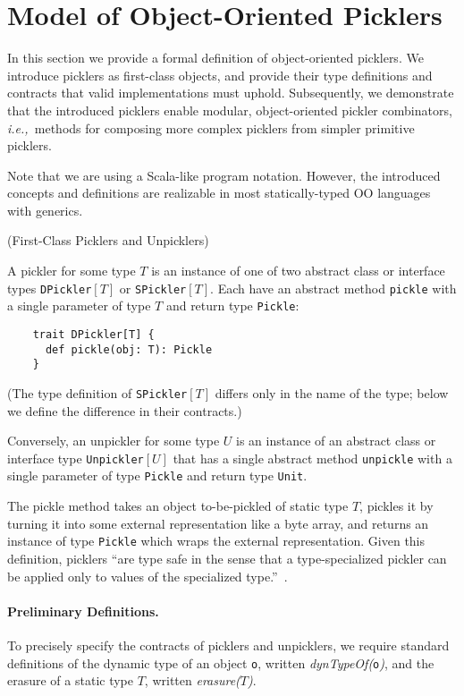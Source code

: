 \documentclass[preprint,10pt]{sigplanconf}
\theoremstyle{definition}
\newcommand{\ie}{{\em i.e.,~}}
\newcommand{\term}[1]{\mbox{\texttt{#1}}}
\newcommand{\itl}[1]{\mbox{\textit{#1}}}
\begin{document}
\section{Model of Object-Oriented Picklers}

In this section we provide a formal definition of object-oriented picklers. We
introduce picklers as first-class objects, and provide their type definitions
and contracts that valid implementations must uphold. Subsequently, we
demonstrate that the introduced picklers enable modular, object-oriented
pickler combinators, \ie methods for composing more complex picklers from
simpler primitive picklers.

Note that we are using a Scala-like program notation. However, the introduced
concepts and definitions are realizable in most statically-typed OO languages
with generics.

\begin{defn}(First-Class Picklers and Unpicklers)

A pickler for some type $T$ is an instance of one of two abstract class or
interface types \term{DPickler}$[T]$ or \term{SPickler}$[T]$. Each have an
abstract method \verb|pickle| with a single parameter of type $T$ and return
type \term{Pickle}:

\begin{lstlisting}
    trait DPickler[T] {
      def pickle(obj: T): Pickle
    }
\end{lstlisting}

\noindent(The type definition of \term{SPickler}$[T]$ differs only in the name of the type;
below we define the difference in their contracts.)

Conversely, an unpickler for some type $U$ is an instance of an abstract class
or interface type \term{Unpickler}$[U]$ that has a single abstract method
\verb|unpickle| with a single parameter of type \term{Pickle} and return type
\term{Unit}.
\end{defn}

The pickle method takes an object to-be-pickled of static type $T$, pickles it
by turning it into some external representation like a byte array, and returns
an instance of type \term{Pickle} which wraps the external representation. Given this
definition, picklers ``are type safe in the sense that a type-specialized
pickler can be applied only to values of the specialized type.''~\cite{Elsman2005}.

\paragraph{Preliminary Definitions.} To precisely specify the contracts of
picklers and unpicklers, we require standard definitions of the dynamic type
of an object \term{o}, written \itl{dynTypeOf(}\term{o}\itl{)}, and the erasure of a
static type $T$, written \itl{erasure(}$T$\itl{)}.
\end{document}
